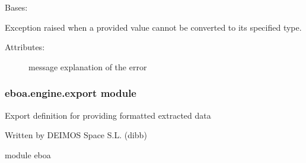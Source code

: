 
\begin{fulllineitems}
\label{\detokenize{eboa.engine:eboa.engine.errors.WrongValue}}
Bases: {\hyperref[\detokenize{eboa.engine:eboa.engine.errors.Error}]{}}

Exception raised when a provided value cannot be converted to its specified type.
\begin{description}
\item[{Attributes:}] \leavevmode
message \textendash{} explanation of the error

\end{description}

\end{fulllineitems}



\subsubsection{eboa.engine.export module}
\label{\detokenize{eboa.engine:module-eboa.engine.export}}\label{\detokenize{eboa.engine:eboa-engine-export-module}}
Export definition for providing formatted extracted data

Written by DEIMOS Space S.L. (dibb)

module eboa

\begin{fulllineitems}
\label{\detokenize{eboa.engine:eboa.engine.export.build_object_structure}}
\end{fulllineitems}


\begin{fulllineitems}
\label{\detokenize{eboa.engine:eboa.engine.export.build_values_structure}}
\end{fulllineitems}

